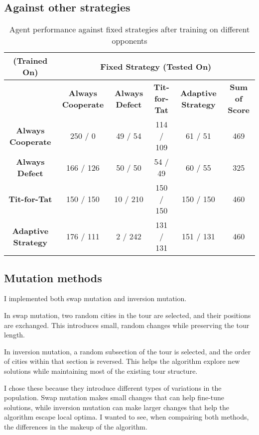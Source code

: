 \documentclass[11pt]{scrartcl} %
\begin{document}
\subsection{Against other strategies}
\begin{table}[h!]
    \centering
    \begin{tabular}{|c|c|c|c|c|c|}
        \hline
		\textbf{(Trained On)} & \multicolumn{5}{c|}{\textbf{Fixed Strategy (Tested On)}} \\ \hline
        \textbf{} & \textbf{Always Cooperate} & \textbf{Always Defect} & \textbf{Tit-for-Tat} & \textbf{Adaptive Strategy} & \textbf{Sum of Score} \\ \hline        
        \textbf{Always Cooperate} & 250 / 0 & 49 / 54 & 114 / 109 & 61 / 51 & 469\\ \hline
        \textbf{Always Defect} & 166 / 126 & 50 / 50 & 54 / 49 & 60 / 55 & 325\\ \hline
        \textbf{Tit-for-Tat} & 150 / 150 & 10 / 210 & 150 / 150 & 150 / 150 & 460\\ \hline
        \textbf{Adaptive Strategy} & 176 / 111 & 2 / 242 & 131 / 131 & 151 / 131 & 460\\ \hline
    \end{tabular}
    \caption{Agent performance against fixed strategies after training on different opponents}
    \label{tab:agent_vs_fixed_strats}
\end{table}







\subsection{Mutation methods}

I implemented both swap mutation and inversion mutation.

In swap mutation, two random cities in the tour are selected, and their positions are exchanged. This introduces small, random changes while preserving the tour length.

In inversion mutation, a random subsection of the tour is selected, and the order of cities within that section is reversed. This helps the algorithm explore new solutions while maintaining most of the existing tour structure.

I chose these because they introduce different types of variations in the population. Swap mutation makes small changes that can help fine-tune solutions, while inversion mutation can make larger changes that help the algorithm escape local optima. 
I wanted to see, when compairing both methods, the differences in the makeup of the algorithm.
\end{document}
